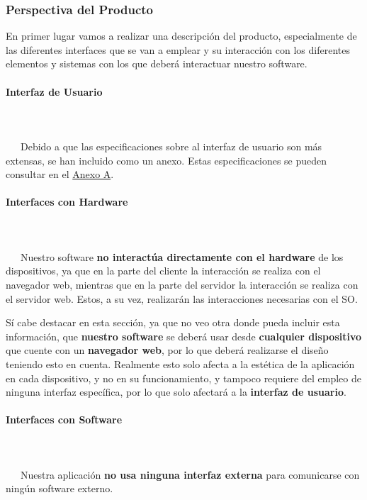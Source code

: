 \subsubsection{Perspectiva del Producto}
En primer lugar vamos a realizar una descripción del producto, especialmente de las diferentes interfaces que se van a emplear y su interacción con los diferentes elementos y sistemas con los que deberá interactuar nuestro software.

\paragraph{Interfaz de Usuario}
~\\\\
\-\ \-\ \-\ Debido a que las especificaciones sobre al interfaz de usuario son más extensas, se han incluido como un anexo. Estas especificaciones se pueden consultar en el \hyperref[sec:apenA]{Anexo A}.


\paragraph{Interfaces con Hardware}
~\\\\
\-\ \-\ \-\ Nuestro software \textbf{no interactúa directamente con el hardware} de los dispositivos, ya que en la parte del cliente la interacción se realiza con el navegador web, mientras que en la parte del servidor la interacción se realiza con el servidor web. Estos, a su vez, realizarán las interacciones necesarias con el SO.

Sí cabe destacar en esta sección, ya que no veo otra donde pueda incluir esta información, que \textbf{nuestro software} se deberá usar desde \textbf{cualquier dispositivo} que cuente con un \textbf{navegador web}, por lo que deberá realizarse el diseño teniendo esto en cuenta. Realmente esto solo afecta a la estética de la aplicación en cada dispositivo, y no en su funcionamiento, y tampoco requiere del empleo de ninguna interfaz específica, por lo que solo afectará a la \textbf{interfaz de usuario}. 


\paragraph{Interfaces con Software}
~\\\\
\-\ \-\ \-\ Nuestra aplicación \textbf{no usa ninguna interfaz externa} para comunicarse con ningún software externo. 

